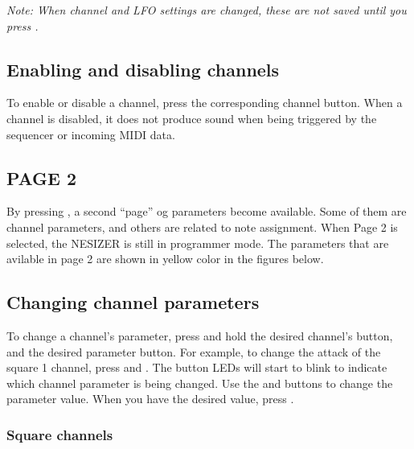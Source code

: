 \documentclass[a4paper, 12p, titlepaget]{book}
\newcommand \name {NESIZER }
\newcommand {\btn}[1] {\framebox{\textbf{\footnotesize #1}}}
\begin{document}
\emph{Note: When channel and LFO settings are changed, these are not saved until you press \btn{SAVE}.}

\subsection{Enabling and disabling channels}
To enable or disable a channel, press the corresponding channel button. When a channel is disabled, it does not produce sound when being triggered by the sequencer or incoming MIDI data.

\subsection{PAGE 2}

By pressing \btn{PAGE 2}, a second ``page'' og parameters become available. Some of them are channel parameters, and others are related to note assignment. When Page 2 is selected, the \name is still in programmer mode. The parameters that are avilable in page 2 are shown in yellow color in the figures below.

\subsection{Changing channel parameters}
To change a channel's parameter, press and hold the desired channel's button, and the desired parameter button. For example, to change the attack of the square 1 channel, press \btn{SQ1} and \btn{A}. The button LEDs will start to blink to indicate which channel parameter is being changed. Use the \btn{UP} and \btn{DOWN} buttons to change the parameter value. When you have the desired value, press \btn{SAVE}.

\subsubsection{Square channels}

\end{document}
